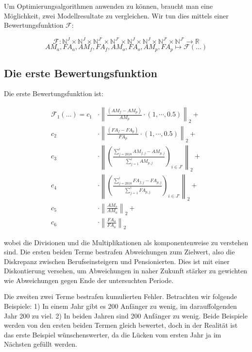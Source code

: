 \documentclass[a4paper,12pt]{article}
\begin{document}
Um Optimierungsalgorithmen anwenden zu können, braucht man eine Möglichkeit, zwei Modellresultate zu vergleichen. Wir tun dies mittels einer Bewertungsfunktion $\mathcal F$:

\begin{equation*}
\mathcal F: \mathbb{N}^J \times \mathbb{N}^J \times \mathbb{N}^{J'} \times \mathbb{N}^{J'} \times \mathbb{N}^{J} \times \mathbb{N}^{J} \times \mathbb{N}^{J'} \times \mathbb{N}^{J'} \rightarrow \mathbb R
\end{equation*}
\begin{equation*}
AM_a, FA_a, AM_f, FA_f, AM_o, FA_o, AM_p, FA_p \mapsto \mathcal F(\hdots)
\end{equation*}




\subsection{Die erste Bewertungsfunktion}

Die erste Bewertungsfunktion ist:

\begin{align*}
\mathcal F_1(\hdots) = c_1 &\cdot \left\| \frac{(AM_f - AM_p)}{AM_p} \cdot (1, \cdots, 0.5)  \right\|_2 + \\
			  c_2 &\cdot \left\| \frac{(FA_f - FA_p)}{FA_p} \cdot (1, \cdots, 0.5)  \right\|_2  +\\
			  c_3 &\cdot \left\| \left( \frac{ \sum\nolimits_{j=2018}^i AM_{f,j} - AM_{p,j} }{\sum\nolimits_{j=1}^i AM_{p,j} } \right)_{i\in J'} \right\|_2 +\\
			  c_4 &\cdot \left\| \left( \frac{ \sum\nolimits_{j=2018}^i FA_{f,j} - FA_{p,j} }{\sum\nolimits_{j=1}^i FA_{p,j} } \right)_{i\in J'} \right\|_2 +\\
			  c_5 &\cdot \left\| \frac{AM_o}{AM_a} \right\|_2 +\\
			  c_6 &\cdot \left\| \frac{FA_o}{FA_a} \right\|_2 
\end{align*}

wobei die Divisionen und die Multiplikationen als komponentenweise zu verstehen sind. Die ersten beiden Terme bestrafen Abweichungen zum Zielwert, also die Diskrepanz zwischen Berufseinsteigern und Pensionierten. Dies ist mit einer Diskontierung versehen, um Abweichungen in naher Zukunft stärker zu gewichten wie Abweichungen gegen Ende der untersuchten Periode. 

Die zweiten zwei Terme bestrafen kumulierten Fehler. Betrachten wir folgende Beispiele: 1) In einem Jahr gibt es 200 Anfänger zu wenig, im darauffolgenden Jahr 200 zu viel. 2) In beiden Jahren sind 200 Anfänger zu wenig. Beide Beispiele werden von den ersten beiden Termen gleich bewertet, doch in der Realität ist das erste Beispiel wünschenswerter, da die Lücken vom ersten Jahr ja im Nächsten gefüllt werden. 
\end{document}

